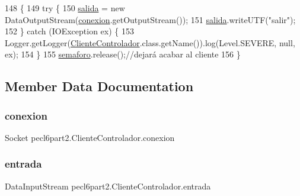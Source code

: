 \begin{DoxyCode}
148         \{
149             \textcolor{keywordflow}{try} \{
150                 \mbox{\hyperlink{classpecl6part2_1_1_cliente_controlador_a05461ea286f84b5f3f8b82641a5d23af}{salida}}  = \textcolor{keyword}{new} DataOutputStream(\mbox{\hyperlink{classpecl6part2_1_1_cliente_controlador_a4882463501ccc3555c15225ea3076745}{conexion}}.getOutputStream());
151                 \mbox{\hyperlink{classpecl6part2_1_1_cliente_controlador_a05461ea286f84b5f3f8b82641a5d23af}{salida}}.writeUTF(\textcolor{stringliteral}{"salir"});
152             \} \textcolor{keywordflow}{catch} (IOException ex) \{
153                 Logger.getLogger(\mbox{\hyperlink{classpecl6part2_1_1_cliente_controlador_a6e526681bd2137858bfb2940eeb23cc8}{ClienteControlador}}.class.getName()).log(Level.SEVERE, 
      null, ex);
154             \}
155             \mbox{\hyperlink{classpecl6part2_1_1_cliente_controlador_a200ce4defcaa86a68e9c8234f9e48a81}{semaforo}}.release();\textcolor{comment}{//dejará acabar al cliente}
156         \}
\end{DoxyCode}


\subsection{Member Data Documentation}
\mbox{\label{classpecl6part2_1_1_cliente_controlador_a4882463501ccc3555c15225ea3076745}} 
\subsubsection{\texorpdfstring{conexion}{conexion}}
{\footnotesize\ttfamily Socket pecl6part2.\+Cliente\+Controlador.\+conexion\hspace{0.3cm}{\ttfamily [package]}}

\mbox{\label{classpecl6part2_1_1_cliente_controlador_aaafa871f0ee5e5d481b9ffb65b9a2a8a}} 
\subsubsection{\texorpdfstring{entrada}{entrada}}
{\footnotesize\ttfamily Data\+Input\+Stream pecl6part2.\+Cliente\+Controlador.\+entrada\hspace{0.3cm}{\ttfamily [package]}}

